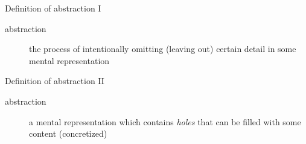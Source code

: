 { %
  \begin{frame}[plain]
  \end{frame}
}

{ %
  \begin{frame}[plain]
  \end{frame}
}

\begin{frame}{Definition of abstraction I}
  \begin{description}
  \item [abstraction] the process of intentionally
    omitting (leaving out) certain detail in some mental representation
  \end{description}
\end{frame}

\begin{frame}{Definition of abstraction II}
  \begin{description}
  \item [abstraction] a mental representation which
    contains \textit{holes} that can be filled with some
    content (concretized)
  \end{description}
\end{frame}
